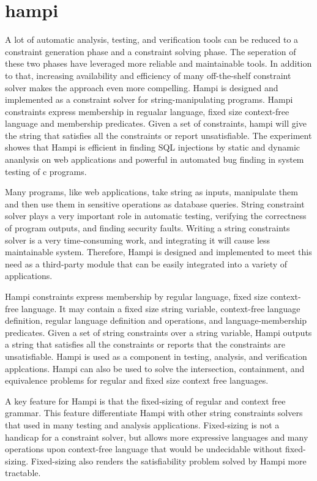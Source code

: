 \section{hampi}
A lot of automatic analysis, testing, and verification tools can be reduced to a constraint generation phase and a constraint solving phase. The seperation of these two phases have leveraged more reliable and maintainable tools. In addition to that, increasing availability and efficiency of many off-the-shelf constraint solver makes the approach even more compelling. Hampi \cite{hampi} is designed and implemented as a constraint solver for string-manipulating programs. Hampi constraints express membership in regualar language, fixed size context-free language and membership predicates. Given a set of constraints, hampi will give the string that satisfies all the constraints or report unsatisfiable. The experiment showes that Hampi is efficient in finding SQL injections by static and dynamic ananlysis on web applications and powerful in automated bug finding in system testing of c programs.
 
Many programs, like web applications, take string as inputs, manipulate them and then use them in sensitive operations as database queries. String constraint solver plays a very important role in automatic testing\cite{}, verifying the correctness of program outputs\cite{}, and finding security faults\cite{}. Writing a string constraints solver is a very time-consuming work, and integrating it will cause less maintainable system. Therefore, Hampi is designed and implemented to meet this need as a third-party module that can be easily integrated into a variety of applications.     

Hampi constraints express membership by regular language, fixed size context-free language. It may contain a fixed size string variable, context-free language definition, regular language definition and operations, and language-membership predicates. Given a set of string constraints over a string variable, Hampi outputs a string that satisfies all the constraints or reports that the constraints are unsatisfiable. Hampi is used as a component in testing, analysis, and verification applcations. Hampi can also be used to solve the intersection, containment, and equivalence problems for regular and fixed size context free languages.

A key feature for Hampi is that the fixed-sizing of regular and context free grammar. This feature differentiate Hampi with other string constraints solvers that used in many testing and analysis applications. Fixed-sizing is not a handicap for a constraint solver, but allows more expressive languages and many operations upon context-free language that would be undecidable without fixed-sizing. Fixed-sizing also renders the satisfiability problem solved by Hampi more tractable.


